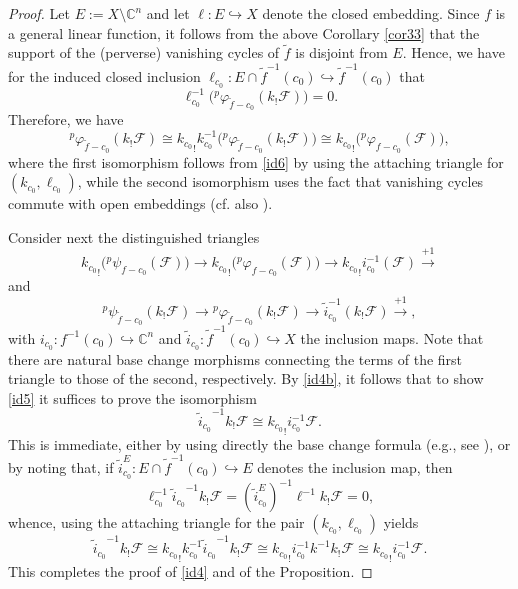 \documentclass[12pt,leqno,twoside]{amsart}
\theoremstyle{plain}
\theoremstyle{definition}
\newcommand{\C}{\mathbb{C}}
\newcommand{\sF}{\mathcal{F}}
\begin{document}
\begin{proof}
Let $E:=X \setminus \C^n$ and let $\ell: E \hookrightarrow X$ denote the closed embedding. Since $f$ is a general linear function, it follows from the above Corollary \ref{cor33} that  the support of the (perverse) vanishing cycles of $\widetilde{f}$ is disjoint from $E$. Hence, we have for the induced closed inclusion $\ell_{c_0}:E \cap \widetilde{f}^{-1}(c_0) \hookrightarrow \widetilde{f}^{-1}(c_0)$ that
\begin{equation}\label{id6}
\ell_{c_0}^{-1}\big( {^p}\varphi_{\widetilde{f}-c_0}(k_!\sF)\big) = 0.
\end{equation}
Therefore, we have
\begin{equation}\label{id4b}
{^p}\varphi_{\widetilde{f}-c_0}(k_!\sF) \cong {k_{c_0}}_!k_{c_0}^{-1}\big({^p}\varphi_{\widetilde{f}-c_0}(k_!\sF)\big)\cong {k_{c_0}}_!\big({^p}\varphi_{f-c_0}(\sF)\big),
\end{equation}
where the first isomorphism follows from \eqref{id6} by using the attaching triangle for $(k_{c_0},\ell_{c_0})$, while the second isomorphism uses the fact that vanishing cycles commute with open embeddings (cf. also \cite[Proposition 10.4.19(2)]{MS}).

Consider next the distinguished triangles
\[
{k_{c_0}}_!\big({^p}\psi_{f-c_0}(\sF)\big)\to {k_{c_0}}_!\big({^p}\varphi_{f-c_0}(\sF)\big)\to {k_{c_0}}_! i_{c_0}^{-1}(\sF) \xrightarrow{+1}
\]
and
\[
{^p}\psi_{\widetilde{f}-c_0}(k_!\sF)\to {^p}\varphi_{\widetilde{f}-c_0}(k_!\sF)\to \widetilde{i}_{c_0}^{-1}(k_!\sF) \xrightarrow{+1},
\]
with $i_{c_0}:f^{-1}(c_0) \hookrightarrow \C^n$ and ${\widetilde i}_{c_0}:\widetilde{f}^{-1}(c_0) \hookrightarrow X$ the inclusion maps.
Note that there are natural base change morphisms connecting the terms of the first triangle to those of the second, respectively. 
By \eqref{id4b}, it follows  that to show \eqref{id5} it suffices to prove the isomorphism
\begin{equation}\label{id7}
{{\widetilde i}_{c_0}}^{-1}k_!\sF\cong {k_{c_0}}_!i_{c_0}^{-1}\sF.
\end{equation}
This is immediate, either by using directly the base change formula (e.g., see \cite[Chapter V, Proposition 10.7]{Bo}), or by noting that, if ${\widetilde i}^E_{c_0}: E \cap \widetilde{f}^{-1}(c_0) \hookrightarrow E$ denotes  the inclusion map, then
\[\ell_{c_0}^{-1} {{\widetilde i}_{c_0}}^{-1}k_!\sF = ({\widetilde i}^E_{c_0})^{-1}\ell^{-1} k_!\sF=0,\]
whence, using the attaching triangle for the pair  $(k_{c_0},\ell_{c_0})$ yields 
\[{{\widetilde i}_{c_0}}^{-1}k_!\sF\cong  {k_{c_0}}_! k_{c_0}^{-1} {{\widetilde i}_{c_0}}^{-1}k_!\sF \cong {k_{c_0}}_! i_{c_0}^{-1} k^{-1} k_!\sF\cong {k_{c_0}}_!i_{c_0}^{-1}\sF.\]
This completes the proof of \eqref{id4} and of the Proposition.
\end{proof}
\end{document}
